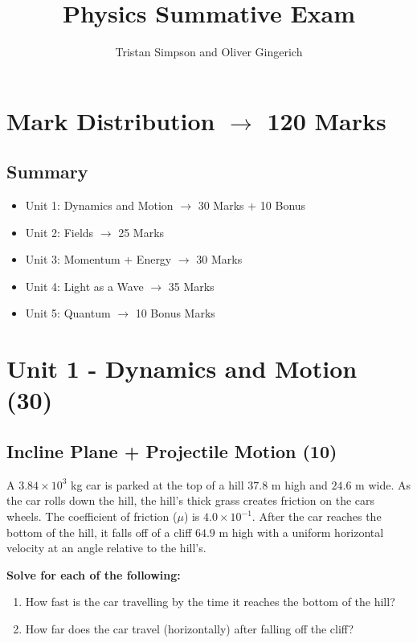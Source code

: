 \documentclass{article}
\title{Physics Summative Exam}
\author{Tristan Simpson and Oliver Gingerich}
\begin{document}
\maketitle
\tableofcontents
\doublespacing

\section{Mark Distribution $\to$ 120 Marks}
\subsection{Summary}
\begin{itemize}
    \item Unit 1: Dynamics and Motion $\to$ 30 Marks + 10 Bonus
    \item Unit 2: Fields $\to$ 25 Marks
    \item Unit 3: Momentum + Energy $\to$ 30 Marks
    \item Unit 4: Light as a Wave $\to$ 35 Marks
    \item Unit 5: Quantum $\to$ 10 Bonus Marks
\end{itemize}

\section{Unit 1 - Dynamics and Motion (30)}
\subsection{Incline Plane + Projectile Motion (10)}
A $3.84 \times 10^3$ kg car is parked at the top of a hill $37.8$ m high and $24.6$ m wide.
As the car rolls down the hill, the hill's thick grass creates friction on the cars wheels. The coefficient of
friction ($\mu$) is $4.0\times 10^{-1}$. After the car reaches the bottom of the hill, it falls
off of a cliff $64.9$ m high with a uniform horizontal velocity at an angle relative to the hill's.

\vspace{10pt}

\noindent\textbf{Solve for each of the following:}
\begin{enumerate}[label=\alph*)]
    \item How fast is the car travelling by the time it reaches the bottom of the hill?
    \item How far does the car travel (horizontally) after falling off the cliff?
\end{enumerate}\leavevmode
\end{document}
